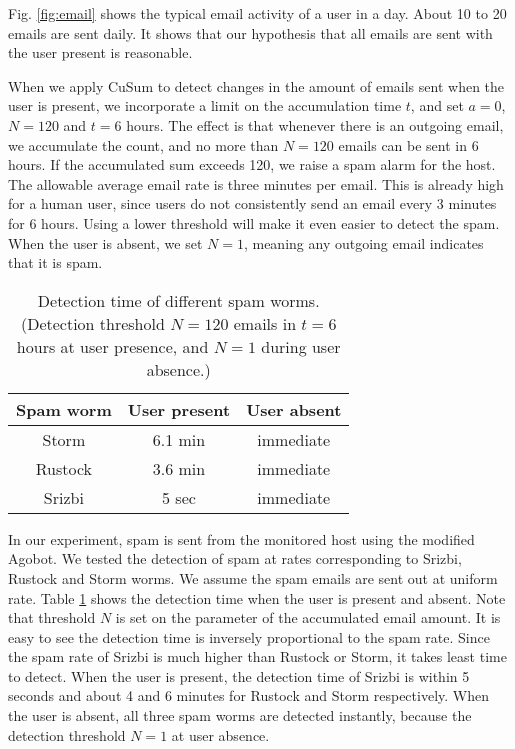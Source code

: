 Fig. \ref{fig:email} shows the typical email activity of a
user in a day. About 10 to 20 emails are sent daily.
It shows that our hypothesis that all emails are sent with the
user present is reasonable.

When we apply CuSum to detect changes in the amount of emails sent when
the user is present, we incorporate a limit on the accumulation time
$t$, and set $a=0$, $N=120$ and $t=6$ hours. The effect is that
whenever there is an outgoing email, we accumulate the count, and no
more than $N=120$ emails can be sent in 6 hours. If the accumulated sum
exceeds 120, we raise a spam alarm for the host. The allowable
average email rate is three minutes per email. This is already high for a
human user, since users do not consistently send an email every 3
minutes for 6 hours. Using a lower threshold will make it even easier
to detect the spam.
When the user is absent, we set $N=1$, meaning any
outgoing email indicates that it is spam.


\begin{table}[!t]
  \centering
  \begin{tabular}{|c|c|c|}
  \hline
  Spam worm  & User present & User absent \\
  \hline
  Storm & 6.1 min & immediate \\
  \hline
  Rustock & 3.6 min & immediate \\
  \hline
  Srizbi & 5 sec & immediate \\ [0.5ex]
  \hline
  \end{tabular}
  \caption{Detection time of different spam worms. (Detection threshold $N=120$ emails in $t=6$ hours at user presence, and $N=1$ during user absence.)}
  \label{tbl:detect-spam}
\end{table}

In our experiment, spam is sent from the monitored host using the
modified Agobot.
We tested the detection of spam at rates corresponding to Srizbi,
Rustock and Storm worms.
We assume the spam emails are sent out at uniform rate.
Table \ref{tbl:detect-spam} shows the
detection time when the user is present and absent.
Note that threshold $N$ is set on the parameter of the accumulated
email amount. It is easy to see the detection time is inversely
proportional to the spam rate. Since the spam rate of Srizbi is much
higher than Rustock or Storm, it takes least time to detect. When
the user is present, the detection time of Srizbi is within 5 seconds
and about 4 and 6 minutes for Rustock and Storm respectively.
When the user is absent, all three spam worms are detected
instantly, because the detection threshold $N=1$ at user absence.

